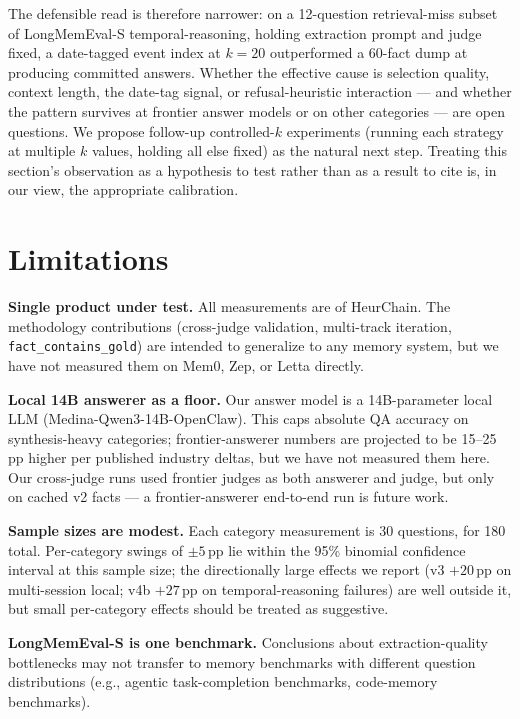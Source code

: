\documentclass{article}
\begin{document}
The defensible read is therefore narrower: on a 12-question retrieval-miss subset of LongMemEval-S temporal-reasoning, holding extraction prompt and judge fixed, a date-tagged event index at $k=20$ outperformed a 60-fact dump at producing committed answers. Whether the effective cause is selection quality, context length, the date-tag signal, or refusal-heuristic interaction --- and whether the pattern survives at frontier answer models or on other categories --- are open questions. We propose follow-up controlled-$k$ experiments (running each strategy at multiple $k$ values, holding all else fixed) as the natural next step. Treating this section's observation as a hypothesis to test rather than as a result to cite is, in our view, the appropriate calibration.

\section{Limitations}
\label{sec:limitations}

\textbf{Single product under test.} All measurements are of HeurChain. The methodology contributions (cross-judge validation, multi-track iteration, \texttt{fact\_contains\_gold}) are intended to generalize to any memory system, but we have not measured them on Mem0, Zep, or Letta directly.

\textbf{Local 14B answerer as a floor.} Our answer model is a 14B-parameter local LLM (Medina-Qwen3-14B-OpenClaw). This caps absolute QA accuracy on synthesis-heavy categories; frontier-answerer numbers are projected to be 15--25\,pp higher per published industry deltas, but we have not measured them here. Our cross-judge runs used frontier judges as both answerer and judge, but only on cached v2 facts --- a frontier-answerer end-to-end run is future work.

\textbf{Sample sizes are modest.} Each category measurement is 30 questions, for 180 total. Per-category swings of $\pm 5$\,pp lie within the 95\% binomial confidence interval at this sample size; the directionally large effects we report (v3 $+20$\,pp on multi-session local; v4b $+27$\,pp on temporal-reasoning failures) are well outside it, but small per-category effects should be treated as suggestive.

\textbf{LongMemEval-S is one benchmark.} Conclusions about extraction-quality bottlenecks may not transfer to memory benchmarks with different question distributions (e.g., agentic task-completion benchmarks, code-memory benchmarks).
\end{document}
